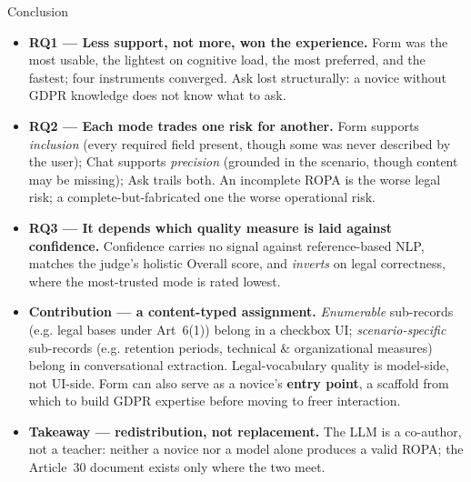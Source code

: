 \documentclass[aspectratio=1610,11pt]{beamer}
\begin{document}
\begin{frame}{Conclusion}
\footnotesize
\linespread{0.96}\selectfont
\begin{itemize}
  \setlength{\itemsep}{0.13cm}
  \item \textbf{RQ1 --- Less support, not more, won the experience.} Form was the most usable,
        the lightest on cognitive load, the most preferred, and the fastest; four instruments
        converged. Ask lost structurally: a novice without GDPR knowledge does not know what to ask.
  \item \textbf{RQ2 --- Each mode trades one risk for another.} Form supports \emph{inclusion}
        (every required field present, though some was never described by the user); Chat supports
        \emph{precision} (grounded in the scenario, though content may be missing); Ask trails both.
        An incomplete ROPA is the worse legal risk; a complete-but-fabricated one the worse operational risk.
  \item \textbf{RQ3 --- It depends which quality measure is laid against confidence.} Confidence
        carries no signal against reference-based NLP, matches the judge's holistic Overall score,
        and \emph{inverts} on legal correctness, where the most-trusted mode is rated lowest.
  \item \textbf{Contribution --- a content-typed assignment.} \emph{Enumerable} sub-records (e.g.
        legal bases under Art~6(1)) belong in a checkbox UI; \emph{scenario-specific} sub-records
        (e.g. retention periods, technical \& organizational measures) belong in conversational
        extraction. Legal-vocabulary quality is model-side, not UI-side. Form can also serve as a
        novice's \textbf{entry point}, a scaffold from which to build GDPR expertise before moving
        to freer interaction.
  \item \textbf{Takeaway --- redistribution, not replacement.} The LLM is a co-author, not a
        teacher: neither a novice nor a model alone produces a valid ROPA; the Article~30 document
        exists only where the two meet.
\end{itemize}
\end{frame}
\end{document}
